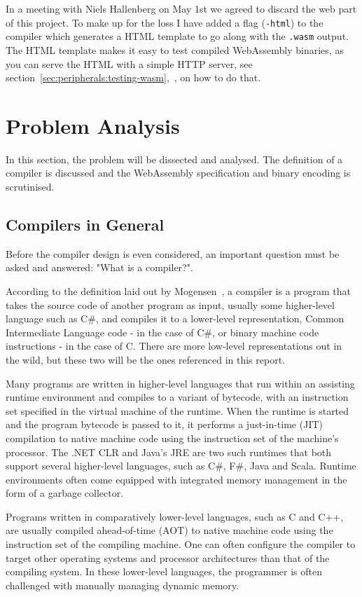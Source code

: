 \documentclass[a4paper]{article}
\begin{document}
In a meeting with Niels Hallenberg on May 1st we agreed to discard the web part of this project. To make up for the loss I have added a flag (\texttt{-html}) to the compiler which generates a HTML template to go along with the \texttt{.wasm} output. The HTML template makes it easy to test compiled WebAssembly binaries, as you can serve the HTML with a simple HTTP server, see section~\ref{sec:peripherals:testing-wasm},~, on how to do that.

\section{Problem Analysis}
\label{sec:problem-analysis}
In this section, the problem will be dissected and analysed. The definition of a compiler is discussed and the WebAssembly specification and binary encoding is scrutinised.

\subsection{Compilers in General}
\label{sec:problem-analysis:compilers}
Before the compiler design is even considered, an important question must be asked and answered: "What is a compiler?".

According to the definition laid out by Mogensen~\cite{BCD}, a compiler is a program that takes the source code of another program as input, usually some higher-level language such as C\#, and compiles it to a lower-level representation, Common Intermediate Language code - in the case of C\#, or binary machine code instructions - in the case of C. There are more low-level representations out in the wild, but these two will be the ones referenced in this report.

Many programs are written in higher-level languages that run within an assisting runtime environment and compiles to a variant of bytecode, with an instruction set specified in the virtual machine of the runtime. When the runtime is started and the program bytecode is passed to it, it performs a just-in-time (JIT) compilation to native machine code using the instruction set of the machine's processor. The .NET CLR and Java's JRE are two such runtimes that both support several higher-level languages, such as C\#, F\#, Java and Scala. Runtime environments often come equipped with integrated memory management in the form of a garbage collector.

Programs written in comparatively lower-level languages, such as C and C++, are usually compiled ahead-of-time (AOT) to native machine code using the instruction set of the compiling machine. One can often configure the compiler to target other operating systems and processor architectures than that of the compiling system. In these lower-level languages, the programmer is often challenged with manually managing dynamic memory.
\end{document}
